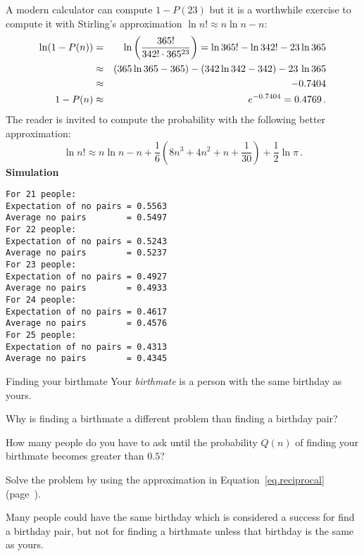A modern calculator can compute $1-P(23)$ but it is a worthwhile exercise to compute it with Stirling's approximation $\ln n! \approx n\ln n - n$:
\begin{eqnarray*}
\ln (1-P(n))&=&
  \ln\left(\displaystyle\frac{365!}{342!\cdot 365^{23}}\right)=\ln 365! - \ln 342! -23 \ln 365\\
&\approx& (365\ln 365 -365) - (342\ln 342 -342) - 23\,\ln 365 \\
&\approx&-0.7404\\
1-P(n)&\approx&e^{-0.7404}=0.4769\,.
\end{eqnarray*}
The reader is invited to compute the probability with the following better approximation:
\[
\ln n!  \approx n\ln n - n + \frac{1}{6}\left(8n^3+4n^2+n+\frac{1}{30}\right)+\frac{1}{2}\ln\pi\,.
\]
\textbf{Simulation}
\begin{verbatim}
For 21 people:
Expectation of no pairs = 0.5563
Average no pairs        = 0.5497
For 22 people:
Expectation of no pairs = 0.5243
Average no pairs        = 0.5237
For 23 people:
Expectation of no pairs = 0.4927
Average no pairs        = 0.4933
For 24 people:
Expectation of no pairs = 0.4617
Average no pairs        = 0.4576
For 25 people:
Expectation of no pairs = 0.4313
Average no pairs        = 0.4345
\end{verbatim}


\begin{prob}{Finding your birthmate}
Your \emph{birthmate} is a person with the same birthday as yours.

Why is finding a birthmate a different problem than finding a birthday pair?

 How many people do you have to ask until the probability $Q(n)$ of finding your birthmate becomes greater than $0.5$?

Solve the problem by using the approximation in Equation~\ref{eq.reciprocal} (page~\pageref{eq.reciprocal}).
\end{prob}

\solution{}

Many people could have the same birthday which is considered a success for find a birthday pair, but not for finding a birthmate unless that birthday is the same as yours.

